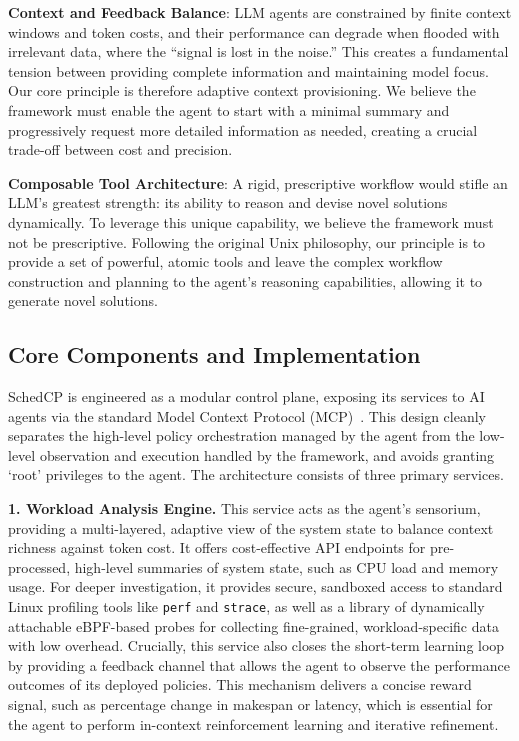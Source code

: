 \textbf{Context and Feedback Balance}: LLM agents are constrained by finite context windows and token costs, and their performance can degrade when flooded with irrelevant data, where the ``signal is lost in the noise.'' This creates a fundamental tension between providing complete information and maintaining model focus. Our core principle is therefore adaptive context provisioning. We believe the framework must enable the agent to start with a minimal summary and progressively request more detailed information as needed, creating a crucial trade-off between cost and precision.

\textbf{Composable Tool Architecture}: A rigid, prescriptive workflow would stifle an LLM's greatest strength: its ability to reason and devise novel solutions dynamically. To leverage this unique capability, we believe the framework must not be prescriptive. Following the original Unix philosophy, our principle is to provide a set of powerful, atomic tools and leave the complex workflow construction and planning to the agent's reasoning capabilities, allowing it to generate novel solutions.

\subsection{Core Components and Implementation}
SchedCP is engineered as a modular control plane, exposing its services to AI agents via the standard Model Context Protocol (MCP)~\cite{anthropic2024mcp}. This design cleanly separates the high-level policy orchestration managed by the agent from the low-level observation and execution handled by the framework, and avoids granting `root' privileges to the agent. The architecture consists of three primary services.

\textbf{1. Workload Analysis Engine.} This service acts as the agent's sensorium, providing a multi-layered, adaptive view of the system state to balance context richness against token cost. It offers cost-effective API endpoints for pre-processed, high-level summaries of system state, such as CPU load and memory usage. For deeper investigation, it provides secure, sandboxed access to standard Linux profiling tools like \texttt{perf} and \texttt{strace}, as well as a library of dynamically attachable eBPF-based probes for collecting fine-grained, workload-specific data with low overhead. Crucially, this service also closes the short-term learning loop by providing a feedback channel that allows the agent to observe the performance outcomes of its deployed policies. This mechanism delivers a concise reward signal, such as percentage change in makespan or latency, which is essential for the agent to perform in-context reinforcement learning and iterative refinement.

